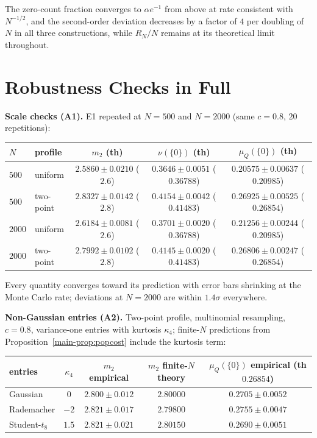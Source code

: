 \documentclass[10pt,onecolumn]{IEEEtran}
\theoremstyle{remark}
\begin{document}
The zero-count fraction converges to $\alpha e^{-1}$ from above at rate
consistent with $N^{-1/2}$, and the second-order deviation decreases by a
factor of $4$ per doubling of $N$ in all three constructions, while $R_N/N$
remains at its theoretical limit throughout.

\section{Robustness Checks in Full}\label{sec:S27}

\textbf{Scale checks (A1).} E1 repeated at $N=500$ and $N=2000$ (same $c=0.8$,
$20$ repetitions):

\begin{center}
\renewcommand{\arraystretch}{1.15}
\begin{tabular}{llccc}
\toprule
$N$ & profile & $m_2$ (th) & $\nu(\{0\})$ (th) & $\mu_Q(\{0\})$ (th) \\
\midrule
$500$  & uniform   & $2.5860\pm0.0210$ ($2.6$) & $0.3646\pm0.0051$ ($0.36788$) & $0.20575\pm0.00637$ ($0.20985$) \\
$500$  & two-point & $2.8327\pm0.0142$ ($2.8$) & $0.4154\pm0.0042$ ($0.41483$) & $0.26925\pm0.00525$ ($0.26854$) \\
$2000$ & uniform   & $2.6184\pm0.0081$ ($2.6$) & $0.3701\pm0.0020$ ($0.36788$) & $0.21256\pm0.00244$ ($0.20985$) \\
$2000$ & two-point & $2.7992\pm0.0102$ ($2.8$) & $0.4145\pm0.0020$ ($0.41483$) & $0.26806\pm0.00247$ ($0.26854$) \\
\bottomrule
\end{tabular}
\end{center}

Every quantity converges toward its prediction with error bars shrinking at
the Monte Carlo rate; deviations at $N=2000$ are within $1.4\sigma$
everywhere.

\textbf{Non-Gaussian entries (A2).} Two-point profile, multinomial
resampling, $c=0.8$, variance-one entries with kurtosis $\kappa_4$; finite-$N$
predictions from Proposition~\ref{main-prop:popcost} include the kurtosis term:

\begin{center}
\renewcommand{\arraystretch}{1.15}
\begin{tabular}{lcccc}
\toprule
entries & $\kappa_4$ & $m_2$ empirical & $m_2$ finite-$N$ theory & $\mu_Q(\{0\})$ empirical (th $0.26854$) \\
\midrule
Gaussian    & $0$    & $2.800\pm0.012$ & $2.80000$ & $0.2705\pm0.0052$ \\
Rademacher  & $-2$   & $2.821\pm0.017$ & $2.79800$ & $0.2755\pm0.0047$ \\
Student-$t_8$ & $1.5$ & $2.821\pm0.021$ & $2.80150$ & $0.2690\pm0.0051$ \\
\bottomrule
\end{tabular}
\end{center}
\end{document}
